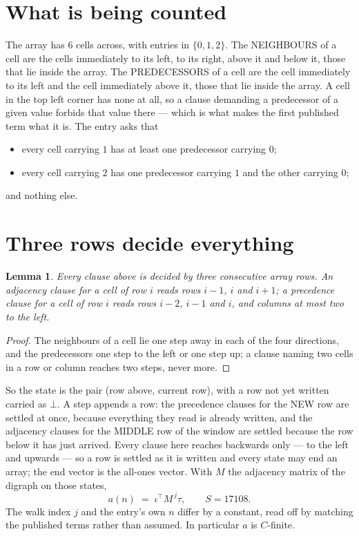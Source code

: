 \documentclass[11pt,a4paper]{article}
\theoremstyle{plain}
\newtheorem{lemma}[theorem]{Lemma}
\theoremstyle{definition}
\begin{document}
\section{What is being counted}

The array has $6$ cells across, with entries in $\{0,1,2\}$. The NEIGHBOURS of a cell are the
cells immediately to its left, to its right, above it and below it, those that lie inside the
array. The PREDECESSORS of a cell are the cell immediately to its left and the cell
immediately above it, those that lie inside the array. A cell in the top left corner has none
at all, so a clause demanding a predecessor of a given value forbids that value there --- which
is what makes the first published term what it is. The entry asks that
\begin{itemize}
\item every cell carrying $1$ has at least one predecessor carrying $0$;
\item every cell carrying $2$ has one predecessor carrying $1$ and the other carrying $0$;
\end{itemize}
and nothing else.

\section{Three rows decide everything}

\begin{lemma}\label{lem:win}
Every clause above is decided by three consecutive array rows. An adjacency clause for a cell
of row $i$ reads rows $i-1$, $i$ and $i+1$; a precedence clause for a cell of row $i$ reads
rows $i-2$, $i-1$ and $i$, and columns at most two to the left.
\end{lemma}

\begin{proof}
The neighbours of a cell lie one step away in each of the four directions, and the predecessors
one step to the left or one step up; a clause naming two cells in a row or column reaches two
steps, never more.
\end{proof}

So the state is the pair (row above, current row), with a row not yet written carried as
$\bot$. A step appends a row: the precedence clauses for the NEW row are settled at once,
because everything they read is already written, and the adjacency clauses for the MIDDLE row
of the window are settled because the row below it has just arrived. Every clause here reaches backwards only --- to the left and upwards --- so a
row is settled as it is written and every state may end an array; the end vector is the
all-ones vector. With $M$ the
adjacency matrix of the digraph on those states,
\[
a(n)\;=\;\iota^{\!\top}M^{\,j}\tau ,\qquad S=17108.
\]
The walk index $j$ and the entry's own $n$ differ by a constant, read off by matching the
published terms rather than assumed. In particular $a$ is $C$-finite.
\end{document}
